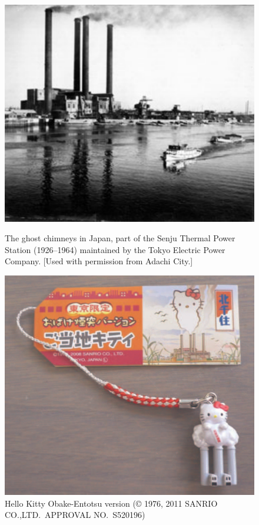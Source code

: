 \documentclass{ws-ijcga}
\begin{document}
\begin{figure}
  \centering
\begin{minipage}[t]{0.47\textwidth}
  \centering
  \includegraphics[width=1\linewidth]{photo}
  \caption{The ghost chimneys in Japan, part of the Senju Thermal Power Station
           (1926--1964) maintained by the Tokyo Electric Power Company.
           [Used with permission from Adachi City.]}
  \label{fig:chimneys}
\end{minipage}
\hfil
\begin{minipage}[t]{0.47\textwidth}
  \centering
  \includegraphics[width=1\linewidth]{kitty}
  \caption{Hello Kitty Obake-Entotsu version (\copyright{} 1976, 2011 SANRIO CO.,LTD.~APPROVAL NO.~S520196)}
  \label{fig:kitty}
\end{minipage}
\end{figure}
\end{document}

